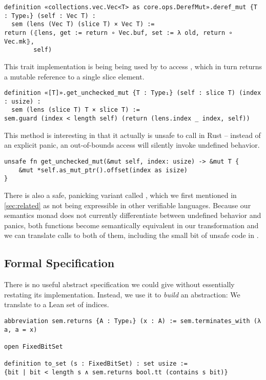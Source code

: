 \begin{verbatim}
definition «collections.vec.Vec<T> as core.ops.DerefMut».deref_mut {T : Type₁} (self : Vec T) :
  sem (lens (Vec T) (slice T) × Vec T) :=
return (⦃lens, get := return ∘ Vec.buf, set := λ old, return ∘ Vec.mk⦄,
        self)
\end{verbatim}

This trait implementation is being being used by  to
access , which in turn returns a mutable reference
to a single slice element.

\begin{verbatim}
definition «[T]».get_unchecked_mut {T : Type₁} (self : slice T) (index : usize) :
  sem (lens (slice T) T × slice T) :=
sem.guard (index < length self) (return (lens.index _ index, self))
\end{verbatim}

This method is interesting in that it actually is unsafe to call in Rust --
instead of an explicit panic, an out-of-bounds access will silently invoke
undefined behavior.

\begin{verbatim}
unsafe fn get_unchecked_mut(&mut self, index: usize) -> &mut T {
    &mut *self.as_mut_ptr().offset(index as isize)
}
\end{verbatim}

There is also a safe, panicking variant called , which we
first mentioned in \autoref{sec:related} as not being expressible in other
verifiable languages. Because our semantics monad does not currently differentiate between
undefined behavior and panics, both functions become semantically equivalent in
our transformation and we can translate calls to both of them, including the
small bit of unsafe code in .

\subsection{Formal Specification}

There is no useful abstract specification we could give  without
essentially restating its implementation. Instead, we use it to \emph{build} an
abstraction: We translate  to a Lean set of indices.

\begin{verbatim}
abbreviation sem.returns {A : Type₁} (x : A) := sem.terminates_with (λ a, a = x)

open FixedBitSet

definition to_set (s : FixedBitSet) : set usize :=
{bit | bit < length s ∧ sem.returns bool.tt (contains s bit)}
\end{verbatim}

